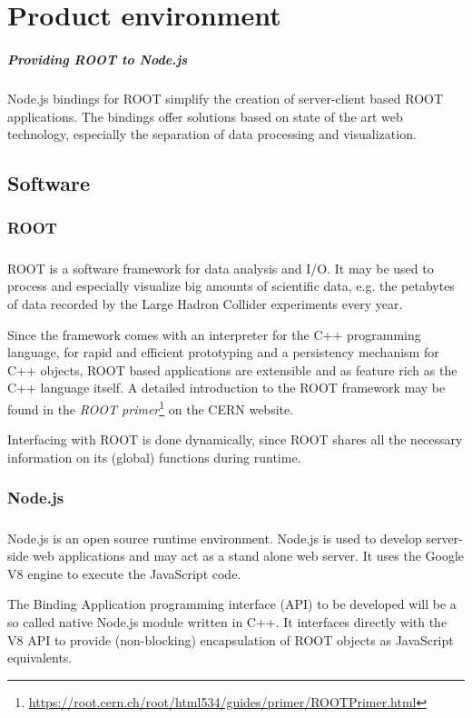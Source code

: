\chapter{Product environment}

\paragraph{Providing ROOT to Node.js}
Node.js bindings for ROOT simplify the creation of server-client based ROOT applications. The bindings offer solutions based on state of the art web technology, especially the separation of data 
processing and visualization.\\

\section{Software}
\subsection{ROOT}

\paragraph{} ROOT is a software framework for data analysis and I/O. It may be used to process and especially visualize big amounts of scientific data, e.g. the petabytes of data recorded by the Large Hadron Collider experiments every year.\par
Since the framework comes with an interpreter for the C++ programming language, for rapid and efficient prototyping and a persistency mechanism for C++ objects, ROOT based applications are  extensible and as feature rich as the C++ language itself.
A detailed introduction to the ROOT framework may be found in the \textit{ROOT  primer}\footnote[1]{\url{https://root.cern.ch/root/html534/guides/primer/ROOTPrimer.html}}
on the CERN website. \par
Interfacing with ROOT is done dynamically, since ROOT shares all the necessary information on its (global) functions during runtime.

\subsection{Node.js}

\paragraph{} Node.js is an open source runtime environment. Node.js is used to develop server-side web applications and may act as a 
stand alone web server. It uses the Google V8 engine to execute the JavaScript code. \par
The Binding Application programming interface (API) to be developed will be a so called native Node.js module written in C++. It interfaces directly with the V8 API to provide (non-blocking) encapsulation of ROOT objects as JavaScript equivalents.

